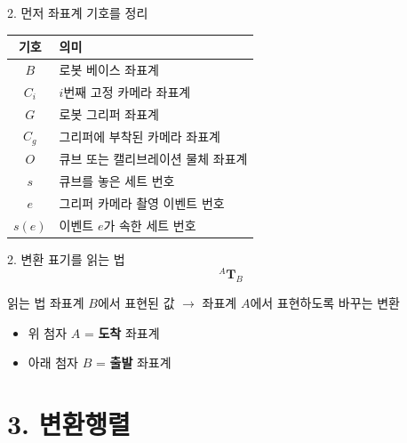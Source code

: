 \documentclass[aspectratio=169,11pt]{beamer}
\begin{document}
\begin{frame}{2. 먼저 좌표계 기호를 정리}
  \begin{center}
    \begin{tabular}{cl}
      \toprule
      기호 & 의미 \\
      \midrule
      $B$      & 로봇 베이스 좌표계 \\
      $C_i$    & $i$번째 고정 카메라 좌표계 \\
      $G$      & 로봇 그리퍼 좌표계 \\
      $C_g$    & 그리퍼에 부착된 카메라 좌표계 \\
      $O$      & 큐브 또는 캘리브레이션 물체 좌표계 \\
      $s$      & 큐브를 놓은 세트 번호 \\
      $e$      & 그리퍼 카메라 촬영 이벤트 번호 \\
      $s(e)$   & 이벤트 $e$가 속한 세트 번호 \\
      \bottomrule
    \end{tabular}
  \end{center}
\end{frame}

\begin{frame}{2. 변환 표기를 읽는 법}
  \[
    {}^{A}\mathbf{T}_{B}
  \]
  \begin{block}{읽는 법}
    좌표계 $B$에서 표현된 값 $\rightarrow$ 좌표계 $A$에서 표현하도록 바꾸는 변환
  \end{block}
  \vfill
  \begin{itemize}
    \item 위 첨자 $A$ = \textbf{도착} 좌표계
    \item 아래 첨자 $B$ = \textbf{출발} 좌표계
  \end{itemize}
\end{frame}

\section{3. 변환행렬}
\end{document}
